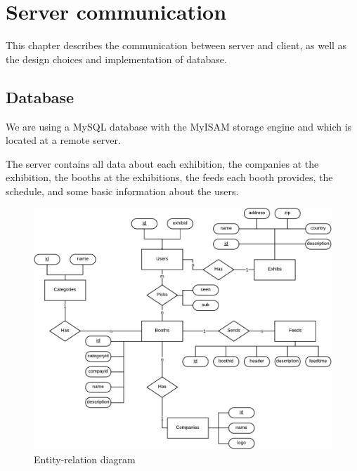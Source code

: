 \chapter{Server communication}
This chapter describes the communication between server and client, as well as the design choices and implementation of database. 

\section{Database}
We are using a MySQL database with the MyISAM storage engine and which is located at a remote server. 

The server contains all data about each exhibition, the companies at the exhibition, the booths at the exhibitions, the feeds each booth provides, the schedule, and some basic information about the users.

\begin{figure}[H]
\centering
\includegraphics[page=1,width=1\linewidth]{img/sw7ERD.pdf}
\caption{Entity-relation diagram}
\label{fig:erd}
\end{figure}


